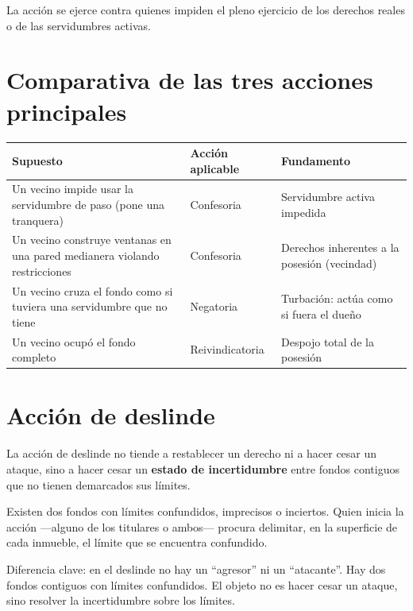 \documentclass[12pt,oneside]{book}
\begin{document}
La acción se ejerce contra quienes impiden el pleno ejercicio de los derechos reales o de las servidumbres activas.

\section{Comparativa de las tres acciones principales}

\begin{table}[H]
\centering
\small
\begin{tabularx}{\textwidth}{
    >{\raggedright\arraybackslash}X
    >{\raggedright\arraybackslash}p{}
    >{\raggedright\arraybackslash}X
}
\toprule
\textbf{Supuesto} & \textbf{Acción aplicable} & \textbf{Fundamento} \\
\midrule
Un vecino impide usar la servidumbre de paso (pone una tranquera) & Confesoria & Servidumbre activa impedida \\
Un vecino construye ventanas en una pared medianera violando restricciones & Confesoria & Derechos inherentes a la posesión (vecindad) \\
Un vecino cruza el fondo como si tuviera una servidumbre que no tiene & Negatoria & Turbación: actúa como si fuera el dueño \\
Un vecino ocupó el fondo completo & Reivindicatoria & Despojo total de la posesión \\
\bottomrule
\end{tabularx}
\end{table}

\section{Acción de deslinde}

La acción de deslinde no tiende a restablecer un derecho ni a hacer cesar un ataque, sino a hacer cesar un \textbf{estado de incertidumbre} entre fondos contiguos que no tienen demarcados sus límites.

Existen dos fondos con límites confundidos, imprecisos o inciertos. Quien inicia la acción ---alguno de los titulares o ambos--- procura delimitar, en la superficie de cada inmueble, el límite que se encuentra confundido.

\begin{important}
Diferencia clave: en el deslinde no hay un ``agresor'' ni un ``atacante''. Hay dos fondos contiguos con límites confundidos. El objeto no es hacer cesar un ataque, sino resolver la incertidumbre sobre los límites.
\end{important}
\end{document}
